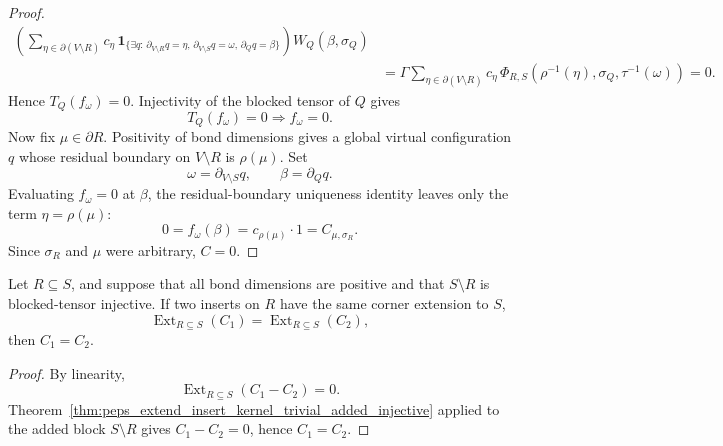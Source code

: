 \begin{proof}
\[\begin{aligned}
        \left(
        \sum_{\eta\in\partial(V\setminus R)}
        c_\eta\,
        \mathbf 1_{\{\exists q:\,
            \partial_{V\setminus R}q=\eta,\,
            \partial_{V\setminus S}q=\omega,\,
            \partial_Qq=\beta\}}
        \right) W_Q(\beta,\sigma_Q) \\
        &=
        \Gamma
        \sum_{\eta\in\partial(V\setminus R)}
        c_\eta\,\Phi_{R,S}(\rho^{-1}(\eta),\sigma_Q,\tau^{-1}(\omega))
        =
        0.
    \end{aligned}
    \]
    Hence $T_Q(f_\omega)=0$.  Injectivity of the blocked tensor of $Q$ gives
    \[
        T_Q(f_\omega)=0 \Longrightarrow f_\omega=0.
    \]
    Now fix $\mu\in\partial R$.  Positivity of bond dimensions gives a global
    virtual configuration $q$ whose residual boundary on $V\setminus R$ is
    $\rho(\mu)$.  Set
    \[
        \omega=\partial_{V\setminus S}q,\qquad
        \beta=\partial_Q q.
    \]
    Evaluating $f_\omega=0$ at $\beta$, the residual-boundary uniqueness identity
    leaves only the term $\eta=\rho(\mu)$:
    \[
        0
        =
        f_\omega(\beta)
        =
        c_{\rho(\mu)}\cdot 1
        =
        C_{\mu,\sigma_R}.
    \]
    Since $\sigma_R$ and $\mu$ were arbitrary, $C=0$.
\end{proof}

\begin{theorem}
    \label{thm:peps_extend_insert_cancel_added_injective}
    \leanok
    Let $R\subseteq S$, and suppose that all bond dimensions are positive and
    that $S\setminus R$ is blocked-tensor injective.  If two inserts on $R$
    have the same corner extension to $S$,
    \[
        \operatorname{Ext}_{R\subseteq S}(C_1)
        =
        \operatorname{Ext}_{R\subseteq S}(C_2),
    \]
    then $C_1=C_2$.
\end{theorem}
\begin{proof}
    \leanok
    By linearity,
    \[
        \operatorname{Ext}_{R\subseteq S}(C_1-C_2)=0.
    \]
    Theorem~\ref{thm:peps_extend_insert_kernel_trivial_added_injective}
    applied to the added block $S\setminus R$ gives $C_1-C_2=0$, hence
    $C_1=C_2$.
\end{proof}

